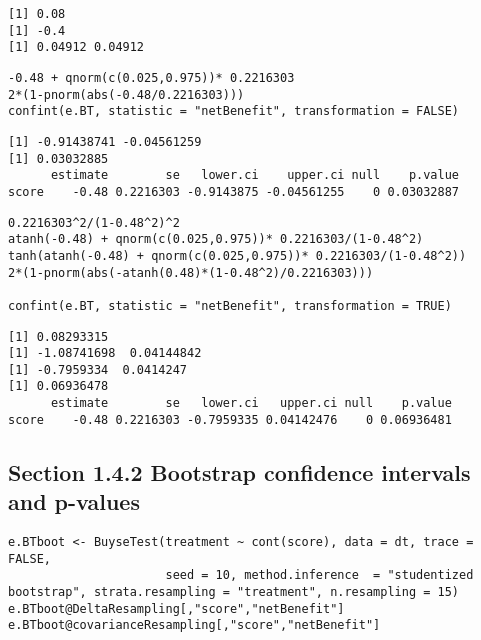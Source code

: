 \documentclass[12pt]{article}
\begin{document}
\begin{verbatim}
[1] 0.08
[1] -0.4
[1] 0.04912 0.04912
\end{verbatim}



\lstset{language=r,label= ,caption= ,captionpos=b,numbers=none}
\begin{lstlisting}
-0.48 + qnorm(c(0.025,0.975))* 0.2216303
2*(1-pnorm(abs(-0.48/0.2216303)))
confint(e.BT, statistic = "netBenefit", transformation = FALSE)
\end{lstlisting}

\begin{verbatim}
[1] -0.91438741 -0.04561259
[1] 0.03032885
      estimate        se   lower.ci    upper.ci null    p.value
score    -0.48 0.2216303 -0.9143875 -0.04561255    0 0.03032887
\end{verbatim}


\lstset{language=r,label= ,caption= ,captionpos=b,numbers=none}
\begin{lstlisting}
0.2216303^2/(1-0.48^2)^2
atanh(-0.48) + qnorm(c(0.025,0.975))* 0.2216303/(1-0.48^2)
tanh(atanh(-0.48) + qnorm(c(0.025,0.975))* 0.2216303/(1-0.48^2))
2*(1-pnorm(abs(-atanh(0.48)*(1-0.48^2)/0.2216303)))

confint(e.BT, statistic = "netBenefit", transformation = TRUE)
\end{lstlisting}

\begin{verbatim}
[1] 0.08293315
[1] -1.08741698  0.04144842
[1] -0.7959334  0.0414247
[1] 0.06936478
      estimate        se   lower.ci   upper.ci null    p.value
score    -0.48 0.2216303 -0.7959335 0.04142476    0 0.06936481
\end{verbatim}

\subsection{Section 1.4.2 Bootstrap confidence intervals and p-values}
\label{sec:orgd2c1eec}

\lstset{language=r,label= ,caption= ,captionpos=b,numbers=none}
\begin{lstlisting}
e.BTboot <- BuyseTest(treatment ~ cont(score), data = dt, trace = FALSE,
                      seed = 10, method.inference  = "studentized bootstrap", strata.resampling = "treatment", n.resampling = 15)
e.BTboot@DeltaResampling[,"score","netBenefit"]
e.BTboot@covarianceResampling[,"score","netBenefit"]
\end{lstlisting}
\end{document}
